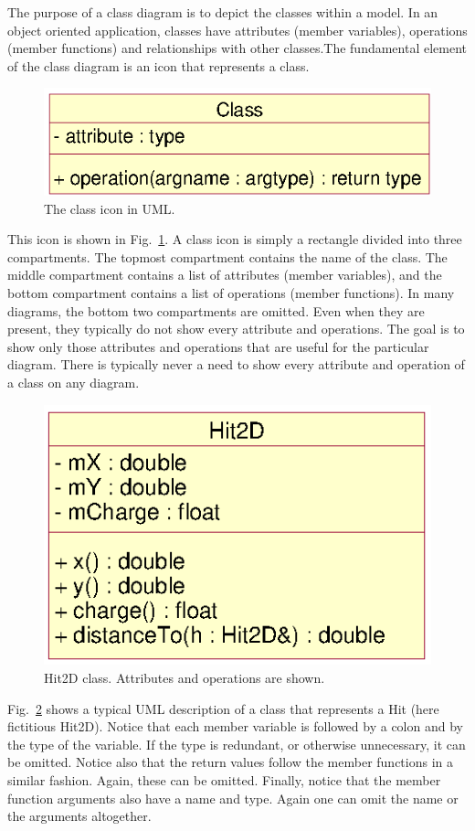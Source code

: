 \documentclass[twoside]{article}
\begin{document}
The purpose of a class diagram is to depict the classes within a
model. In an object oriented application, classes have attributes
(member variables), operations (member functions) and relationships
with other classes.The fundamental element of the class diagram is an
icon that represents a class.
\begin{figure}[htb]
    \begin{center}
        \includegraphics{umlClassIcon.eps}
        \caption{The class icon in UML.}
        \label{fig:umlClassIcon}
    \end{center}
\end{figure}
This icon is shown in Fig.~\ref{fig:umlClassIcon}.  A class icon is
simply a rectangle divided into three compartments. The topmost
compartment contains the name of the class. The middle compartment
contains a list of attributes (member variables), and the bottom
compartment contains a list of operations (member functions).  In many
diagrams, the bottom two compartments are omitted. Even when they are
present, they typically do not show every attribute and operations.
The goal is to show only those attributes and operations that are
useful for the particular diagram.  There is typically never a need to
show every attribute and operation of a class on any diagram.
\begin{figure}[htb]
    \begin{center}
        \includegraphics{umlClass.eps}
        \caption{Hit2D class. Attributes and operations are shown.}
        \label{fig:umlClass}
    \end{center}
\end{figure}
Fig.~\ref{fig:umlClass} shows a typical UML description of a class
that represents a Hit (here fictitious Hit2D).  Notice that each
member variable is followed by a colon and by the type of the
variable. If the type is redundant, or otherwise unnecessary, it can
be omitted. Notice also that the return values follow the member
functions in a similar fashion. Again, these can be omitted. Finally,
notice that the member function arguments also have a name and type.
Again one can omit the name or the arguments altogether.
\end{document}
